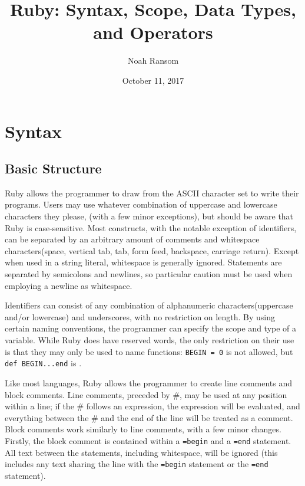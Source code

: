 \documentclass[12pt]{article}
\title{Ruby: Syntax, Scope, Data Types, and Operators}
\author{Noah Ransom}
\date{October 11, 2017}
\begin{document}
\maketitle

\pagebreak

\section{Syntax}
\subsection{Basic Structure}
Ruby allows the programmer to draw from the ASCII character set to write their programs. Users may use whatever combination of uppercase and lowercase characters they please, (with a few minor exceptions), but should be aware that Ruby is case-sensitive. Most constructs, with the notable exception of identifiers, can be separated by an arbitrary amount of comments and whitespace characters(space, vertical tab, tab, form feed, backspace, carriage return). Except when used in a string literal, whitespace is generally ignored. Statements are separated by semicolons and newlines, so particular caution must be used when employing a newline as whitespace\cite{huihoo}.

Identifiers can consist of any combination of alphanumeric characters(uppercase and/or lowercase) and underscores, with no restriction on length. By using certain naming conventions, the programmer can specify the scope and type of a variable. While Ruby does have reserved words, the only restriction on their use is that they may only be used to name functions: \verb|BEGIN = 0| is not allowed, but \verb|def BEGIN...end| is \cite{huihoo}\cite{syntut}.

Like most languages, Ruby allows the programmer to create line comments and block comments. Line comments, preceded by \#, may be used at any position within a line; if the \# follows an expression, the expression will be evaluated, and everything between the \# and the end of the line will be treated as a comment. Block comments work similarly to line comments, with a few minor changes. Firstly, the block comment is contained within a \verb|=begin| and a \verb|=end| statement. All text between the statements, including whitespace, will be ignored (this includes any text sharing the line with the \verb|=begin| statement or the \verb|=end| statement)\cite{huihoo}\cite{syntut}.
\end{document}
